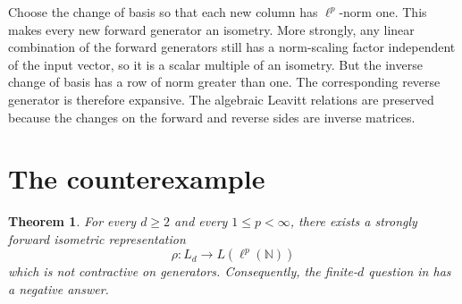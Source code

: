 \documentclass[11pt]{article}
\newtheorem{theorem}{Theorem}
\newcommand{\N}{\mathbb N}
\begin{document}
Choose the change of basis so that each new column has $\ell^p$-norm one.
This makes every new forward generator an isometry. More strongly, any linear
combination of the forward generators still has a norm-scaling factor
independent of the input vector, so it is a scalar multiple of an isometry.
But the inverse change of basis has a row of norm greater than one. The
corresponding reverse generator is therefore expansive. The algebraic Leavitt
relations are preserved because the changes on the forward and reverse sides
are inverse matrices.

\section{The counterexample}

\begin{theorem}\label{thm:main}
For every $d\ge2$ and every $1\le p<\infty$, there exists a strongly forward
isometric representation
\[
 \rho:L_d\longrightarrow L(\ell^p(\N))
\]
which is not contractive on generators. Consequently, the finite-$d$ question
in \cite[Remark~2.13]{Phillips} has a negative answer.
\end{theorem}
\end{document}
